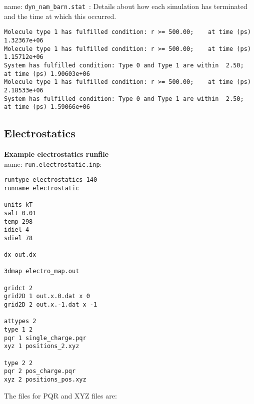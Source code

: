 name: \texttt{dyn\_nam\_barn.stat }: Details about how each simulation has terminated and the time at which this occurred.
\begin{lstlisting}[style = MyBash]
Molecule type 1 has fulfilled condition: r >= 500.00;	 at time (ps) 1.32367e+06
Molecule type 1 has fulfilled condition: r >= 500.00;	 at time (ps) 1.15712e+06
System has fulfilled condition: Type 0 and Type 1 are within  2.50;	 at time (ps) 1.90603e+06
Molecule type 1 has fulfilled condition: r >= 500.00;	 at time (ps) 2.18533e+06
System has fulfilled condition: Type 0 and Type 1 are within  2.50;	 at time (ps) 1.59066e+06
\end{lstlisting}


\subsection{Electrostatics}

\textbf{Example electrostatics runfile} \\

name:  \texttt{run.electrostatic.inp}:
\begin{lstlisting}[style = MyBash]
runtype electrostatics 140
runname electrostatic

units kT
salt 0.01
temp 298
idiel 4 
sdiel 78

dx out.dx

3dmap electro_map.out

gridct 2
grid2D 1 out.x.0.dat x 0
grid2D 2 out.x.-1.dat x -1

attypes 2
type 1 2
pqr 1 single_charge.pqr
xyz 1 positions_2.xyz

type 2 2
pqr 2 pos_charge.pqr
xyz 2 positions_pos.xyz
\end{lstlisting}
\medskip

The files for PQR and XYZ files are: 

